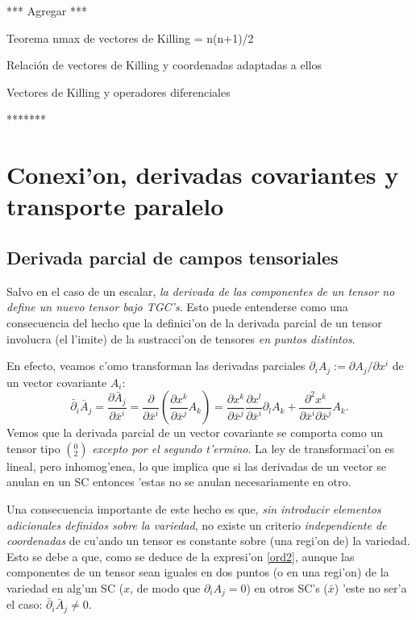 *** Agregar ***

Teorema nmax de vectores de Killing = n(n+1)/2

Relación de vectores de Killing y coordenadas adaptadas a ellos

Vectores de Killing y operadores diferenciales

*******


\section{Conexi'on, derivadas covariantes y transporte paralelo}

\subsection{Derivada parcial de campos tensoriales}

Salvo en el caso de un escalar, \textit{la derivada de las componentes de un tensor no define un nuevo tensor bajo TGC's}. Esto puede entenderse como una consecuencia del hecho que la definici'on de la derivada parcial de un tensor involucra (el l'imite) de la sustracci'on de tensores \textit{en puntos distintos}.

En efecto, veamos c'omo transforman las derivadas parciales $\partial_i
A_j:={\partial A_j}/{\partial x^i}$ de un vector covariante $A_i$:
\begin{equation}
\bar{\partial}_i\bar{A}_j=\frac{\partial \bar{A}_j}{\partial
\bar{x}^i}=\frac{\partial }{\partial \bar{x}^i}\left(\frac{\partial x^k
}{\partial\bar{x}^j }A_k \right)
=\frac{\partial x^k }{\partial\bar{x}^j }\frac{\partial x^l }{\partial\bar{x}^i}
\partial_l A_k +\frac{\partial^2 x^k }{\partial\bar
{x}^i \partial\bar{x}^j }A_k . \label{ord2}
\end{equation}
Vemos que la derivada parcial de un vector covariante se comporta como un tensor tipo $(_2^0)$ \textit{excepto por el segundo t'ermino}. La ley de
transformaci'on es lineal, pero inhomog'enea, lo que implica que si las
derivadas de un vector se anulan en un SC entonces 'estas no se anulan
necesariamente en otro.

Una consecuencia importante de este hecho es que, \textit{sin introducir elementos adicionales definidos sobre la variedad}, no existe un criterio \textit{independiente de coordenadas} de cu'ando un tensor es constante sobre (una regi'on de) la variedad. Esto se debe a que, como se deduce de la expresi'on \eqref{ord2}, aunque las componentes de un tensor sean iguales en dos puntos (o en una regi'on) de la variedad en alg'un SC ($x$, de modo que $\partial_iA_j=0$) en otros SC's ($\bar{x}$) 'este no ser'a el caso: $\bar{\partial}_i\bar{A}_j\neq 0$.
 
